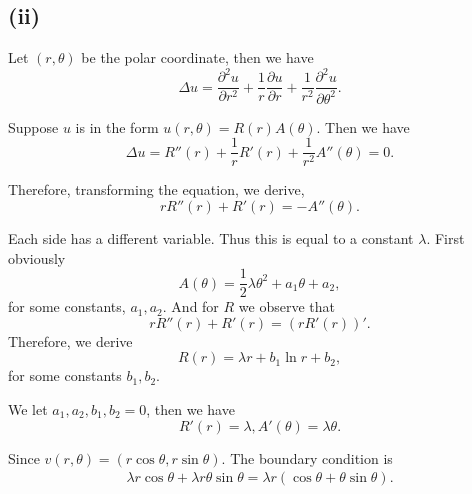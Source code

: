 \documentclass{article}
\begin{document}
\subsection*{(ii)}

Let $(r,\theta)$ be the polar coordinate, then we have
\begin{equation*}
\Delta u = {\frac {\partial^2 u} {\partial r^2}}+{\frac 1 r}{\frac {\partial u} {\partial r}}+{\frac 1 {r^2}}{\frac {\partial^2 u} {\partial \theta^2}}.
\end{equation*}

Suppose $u$ is in the form $u(r,\theta) = R(r)A(\theta)$. Then we have
\begin{equation*}
\Delta u = R''(r)+{\frac 1 r}R'(r)+{\frac 1 {r^2}}A''(\theta) = 0.
\end{equation*}

Therefore, transforming the equation, we derive,
\begin{equation*}
rR''(r)+R'(r)=-A''(\theta).
\end{equation*}

Each side has a different variable. Thus this is equal to a constant $\lambda$. First obviously
\begin{equation*}
A(\theta) = {\frac 1 2}\lambda\theta^2+a_1\theta+a_2,
\end{equation*}
for some constants, $a_1,a_2$. And for $R$ we observe that 
\begin{equation*}
rR''(r)+R'(r) = (rR'(r))'.
\end{equation*}
Therefore, we derive
\begin{equation*}
R(r) = \lambda r+b_1\ln r+b_2,
\end{equation*}
for some constants $b_1,b_2$.

We let $a_1,a_2,b_1,b_2=0$, then we have
\begin{equation*}
R'(r) = \lambda, A'(\theta) = \lambda\theta.
\end{equation*}

Since $v(r,\theta) = (r\cos\theta,r\sin\theta)$. The boundary condition is 
\begin{align*}
\lambda r\cos\theta+\lambda r \theta \sin\theta=\lambda r(\cos\theta+\theta\sin\theta).
\end{align*}
\end{document}
